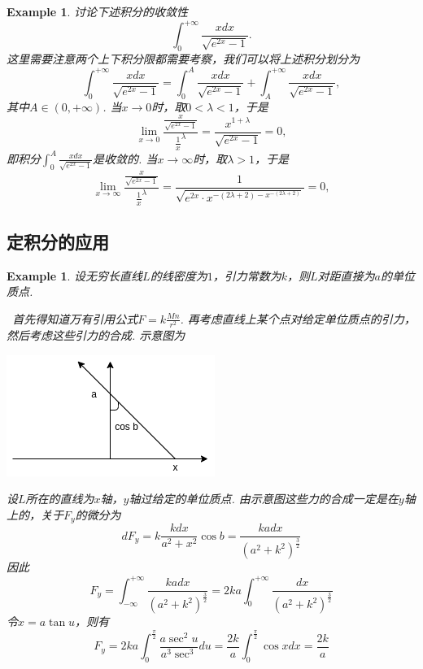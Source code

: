 \documentclass{article}
\newtheorem{example}[theorem]{Example}
\newcommand{\hints}{{\color{blue} \text{hints}}}
\begin{document}
\begin{example}
\rm 讨论下述积分的收敛性
$$
\int_0^{+\infty} \frac{xdx}{\sqrt{e^{2x}-1}}.
$$
\hints 这里需要注意两个上下积分限都需要考察，我们可以将上述积分划分为
$$
\int_0^{+\infty} \frac{xdx}{\sqrt{e^{2x}-1}} = \int_0^{A} \frac{xdx}{\sqrt{e^{2x}-1}} + \int_A^{+\infty} \frac{xdx}{\sqrt{e^{2x}-1}},
$$
其中$A \in (0,+\infty)$. 当$x \to 0$时，取$0 < \lambda < 1$，于是
$$
\lim\limits_{x \to 0} \frac{\frac{x}{\sqrt{e^{2x}-1}}}{\frac{1}{x}^\lambda} = \frac{x^{1+\lambda}}{\sqrt{e^{2x}-1}} = 0,
$$
即积分$\int_0^{A} \frac{xdx}{\sqrt{e^{2x}-1}}$是收敛的. 当$x \to \infty$时，取$\lambda > 1$，于是
$$
\lim\limits_{x \to \infty} \frac{\frac{x}{\sqrt{e^{2x}-1}}}{\frac{1}{x}^\lambda} =  \frac{1}{\sqrt{e^{2x}\cdot x^{-(2\lambda+2)-x^{-(2\lambda+2)}}}} = 0,
$$
\end{example}

\subsection{定积分的应用}

\begin{example}
\rm 设无穷长直线$L$的线密度为$1$，引力常数为$k$，则$L$对距直接为$a$的单位质点.

\hints\ 首先得知道万有引用公式$F = k \frac{Mn}{r^2}$. 再考虑直线上某个点对给定单位质点的引力，然后考虑这些引力的合成. 示意图为
\begin{center}
\includegraphics[scale=0.6]{images/universal_gravitation.png}
\end{center}
设$L$所在的直线为$x$轴，$y$轴过给定的单位质点. 由示意图这些力的合成一定是在$y$轴上的，关于$F_y$的微分为
$$
dF_y = k \frac{kdx}{a^2 + x^2} \cos b = \frac{kadx}{(a^2+k^2)^{\frac{3}{2}}}
$$
因此
$$
F_y = \int_{-\infty}^{+\infty} \frac{kadx}{(a^2+k^2)^{\frac{3}{2}}} = 2ka \int_{0}^{+\infty} \frac{dx}{(a^2+k^2)^{\frac{3}{2}}}
$$
令$x = a\tan u$，则有
$$
F_y = 2ka \int_{0}^{\frac{\pi}{2}} \frac{a\sec^2 u}{a^3\sec^3}du = \frac{2k}{a} \int_{0}^{\frac{\pi}{2}} \cos x dx = \frac{2k}{a}
$$
\end{example}
\end{document}
